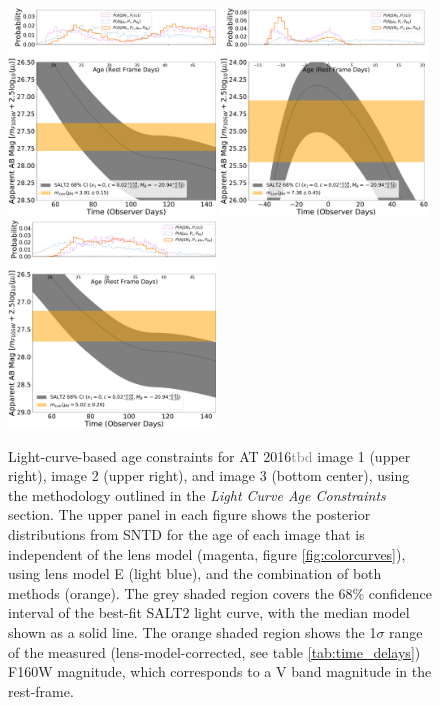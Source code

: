 \documentclass[12pt,dvipsnames]{article}
\def\SNABC{AT 2016{\textcolor{Gray}{tbd}}\xspace}
\begin{document}
\begin{figure}
    \centering
    \includegraphics[width=0.49\textwidth]{Paper/Figures/lightcurve_image1.pdf}
    \includegraphics[width=0.49\textwidth]{Paper/Figures/lightcurve_image2.pdf}
    \includegraphics[width=0.49\textwidth]{Paper/Figures/lightcurve_image3.pdf}
    \caption{Light-curve-based age constraints for \SNABC image 1 (upper right), image 2 (upper right), and image 3 (bottom center), using the methodology outlined in the \textit{Light Curve Age Constraints} section. The upper panel in each figure shows the posterior distributions from SNTD for the age of each image that is independent of the lens model (magenta, figure \ref{fig:colorcurves}), using lens model E (light blue), and the combination of both methods (orange). The grey shaded region covers the 68\% confidence interval of the best-fit SALT2 light curve, with the median model shown as a solid line. The orange shaded region shows the 1$\sigma$ range of the measured (lens-model-corrected, see table \ref{tab:time_delays}) F160W magnitude, which corresponds to a V band magnitude in the rest-frame.}
    \label{fig:lightcurves}
\end{figure}
\end{document}

